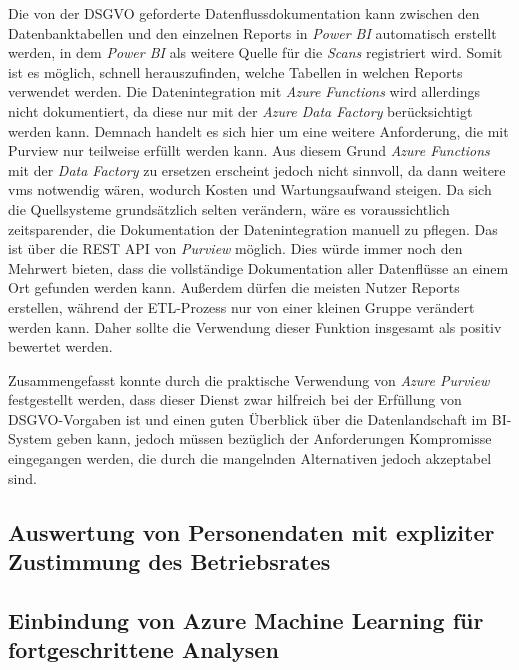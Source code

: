 Die von der DSGVO geforderte Datenflussdokumentation kann zwischen den Datenbanktabellen und den einzelnen Reports in \textit{Power BI} automatisch erstellt werden, in dem \textit{Power BI} als weitere Quelle für die \textit{Scans} registriert wird. Somit ist es möglich, schnell herauszufinden, welche Tabellen in welchen Reports verwendet werden. Die Datenintegration mit \textit{Azure Functions} wird allerdings nicht dokumentiert, da diese nur mit der \textit{Azure Data Factory} berücksichtigt werden kann. Demnach handelt es sich hier um eine weitere Anforderung, die mit Purview nur teilweise erfüllt werden kann. Aus diesem Grund \textit{Azure Functions} mit der \textit{Data Factory} zu ersetzen erscheint jedoch nicht sinnvoll, da dann weitere \acp{vm} notwendig wären, wodurch Kosten und Wartungsaufwand steigen. Da sich die Quellsysteme grundsätzlich selten verändern, wäre es voraussichtlich zeitsparender, die Dokumentation der Datenintegration manuell zu pflegen. Das ist über die REST API von \textit{Purview} möglich. Dies würde immer noch den Mehrwert bieten, dass die vollständige Dokumentation aller Datenflüsse an einem Ort gefunden werden kann. Außerdem dürfen die meisten Nutzer Reports erstellen, während der ETL-Prozess nur von einer kleinen Gruppe verändert werden kann. Daher sollte die Verwendung dieser Funktion insgesamt als positiv bewertet werden. \cite[vgl.][]{lesteve_definitive_2021, msdoc_22_purview_sensLabel, riscutia_data_2021, borosch_cloud_2021}

Zusammengefasst konnte durch die praktische Verwendung von \textit{Azure Purview} festgestellt werden, dass dieser Dienst zwar hilfreich bei der Erfüllung von DSGVO-Vorgaben ist und einen guten Überblick über die Datenlandschaft im BI-System geben kann, jedoch müssen bezüglich der Anforderungen Kompromisse eingegangen werden, die durch die mangelnden Alternativen jedoch akzeptabel sind.

\subsection{Auswertung von Personendaten mit expliziter Zustimmung des Betriebsrates}

\subsection{Einbindung von Azure Machine Learning für fortgeschrittene Analysen}